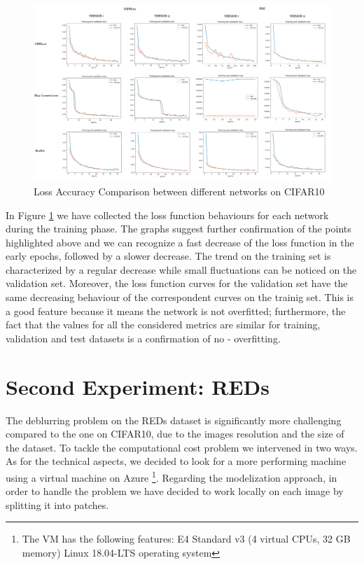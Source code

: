 \documentclass[12pt,a4paper]{article}
\begin{document}
\begin{figure}[hptb]
\includegraphics[scale=0.21]{Loss_accuracy_comparison.png}
\caption{Loss Accuracy Comparison between different networks on CIFAR10}
\label{CIFAR10Loss}
\end{figure}

In Figure \ref{CIFAR10Loss} we have collected the loss function behaviours for each network during the training phase. The graphs suggest further confirmation of the points highlighted above and we can recognize a fast decrease of the loss function in the early epochs, followed by a slower decrease. The trend on the training set is characterized by a regular decrease while small fluctuations can be noticed on the validation set. Moreover, the loss function curves for the validation set have the same decreasing behaviour of the correspondent curves on the trainig set. This is a good feature because it means the network is not overfitted; furthermore, the fact that the values for all the considered metrics are similar for training, validation and test datasets is a confirmation of no - overfitting.


\section{Second Experiment: REDs}
The deblurring problem on the REDs dataset is significantly more challenging compared to the one on CIFAR10, due to the images resolution and the size of the dataset. To tackle the computational cost problem we intervened in two ways. As for the technical aspects, we decided to look for a more performing machine using a virtual machine on Azure \footnote{The VM has the following features: E4 Standard v3 (4 virtual CPUs, 32 GB memory) Linux 18.04-LTS operating system}. Regarding the modelization approach, in order to handle the problem we have decided to work locally on each image by splitting it into patches.
\end{document}
